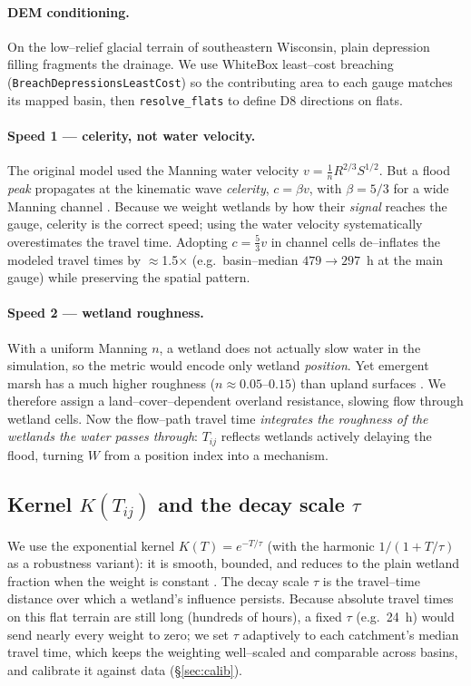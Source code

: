 \documentclass[11pt]{article}
\newcommand{\Ti}{T_{ij}}
\begin{document}
\paragraph{DEM conditioning.} On the low--relief glacial terrain of southeastern Wisconsin, plain
depression filling fragments the drainage. We use WhiteBox least--cost breaching
(\texttt{BreachDepressionsLeastCost}) so the contributing area to each gauge matches its mapped
basin, then \texttt{resolve\_flats} to define D8 directions on flats.

\paragraph{Speed 1 --- celerity, not water velocity.} The original model used the Manning water
velocity $v=\tfrac{1}{n}R^{2/3}S^{1/2}$. But a flood \emph{peak} propagates at the kinematic wave
\emph{celerity}, $c=\beta v$, with $\beta=5/3$ for a wide Manning channel
\citep{lighthill1955,beven2012}. Because we weight wetlands by how their \emph{signal} reaches the
gauge, celerity is the correct speed; using the water velocity systematically overestimates the
travel time. Adopting $c=\tfrac{5}{3}v$ in channel cells de--inflates the modeled travel times by
$\approx$1.5$\times$ (e.g.\ basin--median $479\!\to\!297$~h at the main gauge) while preserving the
spatial pattern.

\paragraph{Speed 2 --- wetland roughness.} With a uniform Manning $n$, a wetland does not actually
slow water in the simulation, so the metric would encode only wetland \emph{position}. Yet
emergent marsh has a much higher roughness ($n\approx0.05$--$0.15$) than upland surfaces
\citep{kadlec1990,arcement1989}. We therefore assign a land--cover--dependent overland resistance,
slowing flow through wetland cells. Now the flow--path travel time \emph{integrates the roughness
of the wetlands the water passes through}: $\Ti$ reflects wetlands actively delaying the flood,
turning $W$ from a position index into a mechanism.

\subsection{Kernel $K(\Ti)$ and the decay scale $\tau$}
We use the exponential kernel $K(T)=e^{-T/\tau}$ (with the harmonic $1/(1+T/\tau)$ as a
robustness variant): it is smooth, bounded, and reduces to the plain wetland fraction when the
weight is constant \citep{workflow}. The decay scale $\tau$ is the travel--time distance over
which a wetland's influence persists. Because absolute travel times on this flat terrain are still
long (hundreds of hours), a fixed $\tau$ (e.g.\ 24~h) would send nearly every weight to zero; we
set $\tau$ adaptively to each catchment's median travel time, which keeps the weighting
well--scaled and comparable across basins, and calibrate it against data (\S\ref{sec:calib}).
\end{document}
